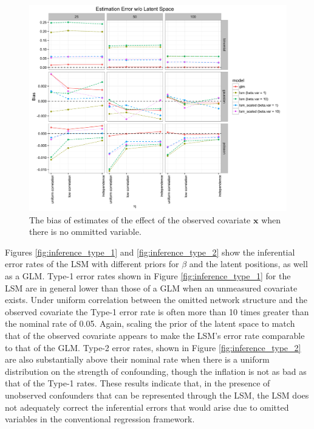 \documentclass[11pt]{article}
\begin{document}
\begin{figure}
\includegraphics[width=\textwidth]{figures/estimation_nls.png}
\caption{The bias of estimates of the effect of the observed covariate $\mathbf{x}$ when there is no ommitted variable.
\label{fig:estimation_nls}}
\end{figure}

Figures \ref{fig:inference_type_1} and \ref{fig:inference_type_2} show the inferential error rates of the LSM with different priors for $\beta$ and the latent positions, as well as a GLM. Type-1 error rates shown in Figure \ref{fig:inference_type_1} for the LSM are in general lower than those of a GLM when an unmeasured covariate exists. Under uniform correlation between the omitted network structure and the observed covariate the Type-1 error rate is often more than 10 times greater than the nominal rate of 0.05. Again, scaling the prior of the latent space to match that of the observed covariate appears to make the LSM's error rate comparable to that of the GLM. Type-2 error rates, shown in Figure \ref{fig:inference_type_2} are also substantially above their nominal rate when there is a uniform distribution on the strength of confounding, though the inflation is not as bad as that of the Type-1 rates. These results indicate that, in the presence of unobserved confounders that can be represented through the LSM, the LSM does not adequately correct the inferential errors that would arise due to omitted variables in the conventional regression framework.
\end{document}
